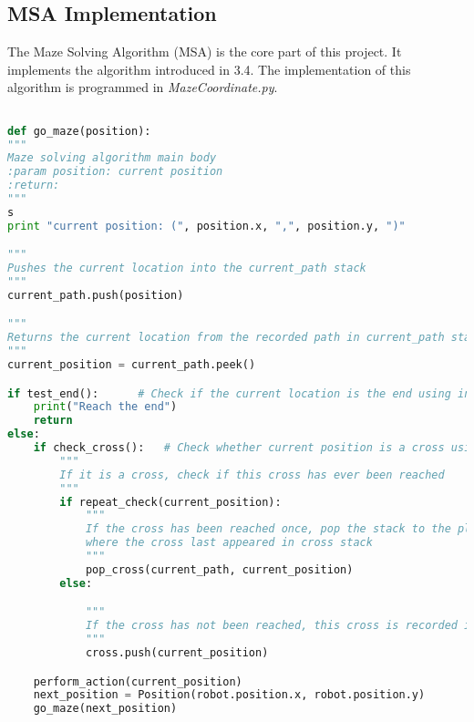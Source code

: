 \documentclass[11pt,times,oneside,openright,hardcopy]{eeereport}
\begin{document}
\subsection{MSA Implementation}
The Maze Solving Algorithm (MSA) is the core part of this project. It implements the algorithm introduced in 3.4.
The implementation of this algorithm is programmed in \textit{MazeCoordinate.py}.
\begin{lstlisting}[language=Python]

def go_maze(position):
"""
Maze solving algorithm main body
:param position: current position
:return:
"""
s
print "current position: (", position.x, ",", position.y, ")"

"""
Pushes the current location into the current_path stack
"""
current_path.push(position)

"""
Returns the current location from the recorded path in current_path stack
"""
current_position = current_path.peek()

if test_end():      # Check if the current location is the end using infrared sensors
    print("Reach the end")
    return
else:
    if check_cross():   # Check whether current position is a cross using ultrasonic sensors
        """
        If it is a cross, check if this cross has ever been reached
        """
        if repeat_check(current_position):
            """
            If the cross has been reached once, pop the stack to the place 
            where the cross last appeared in cross stack
            """
            pop_cross(current_path, current_position)
        else:

            """
            If the cross has not been reached, this cross is recorded into the cross stack
            """
            cross.push(current_position)

    perform_action(current_position)
    next_position = Position(robot.position.x, robot.position.y)
    go_maze(next_position)
\end{lstlisting}
\end{document}

